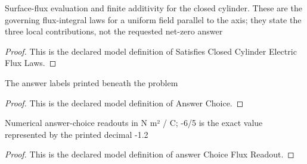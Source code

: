 \begin{definition}
  \label{def:physics:phyx-mini-0846:phyxminiproblems-problemphyxmini0846-satisfiesclosedcylinderelectricfluxlaws}
  Surface-flux evaluation and finite additivity for the closed cylinder. These are the governing flux-integral laws for a uniform field parallel to the axis; they state the three local contributions, not the requested net-zero answer
\end{definition}
\begin{proof}
  This is the declared model definition of Satisfies Closed Cylinder Electric Flux Laws.
\end{proof}
\begin{definition}
  \label{def:physics:phyx-mini-0846:phyxminiproblems-problemphyxmini0846-answerchoice}
  The answer labels printed beneath the problem
\end{definition}
\begin{proof}
  This is the declared model definition of Answer Choice.
\end{proof}
\begin{definition}
  \label{def:physics:phyx-mini-0846:phyxminiproblems-problemphyxmini0846-answerchoicefluxreadout}
  Numerical answer-choice readouts in N m² / C; -6/5 is the exact value represented by the printed decimal -1.2
\end{definition}
\begin{proof}
  This is the declared model definition of answer Choice Flux Readout.
\end{proof}
